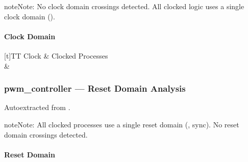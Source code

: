 \documentclass[letterpaper,10pt,english]{sphinxmanual}
\begin{document}
\begin{sphinxadmonition}{note}{Note:}
\sphinxAtStartPar
No clock domain crossings detected. All clocked logic uses a single clock domain ().
\end{sphinxadmonition}


\paragraph{Clock Domain}
\label{\detokenize{modules/pwm_controller/cdc:clock-domain}}

\begin{savenotes}\sphinxattablestart
\sphinxthistablewithglobalstyle
\centering
\begin{tabulary}{\linewidth}[t]{TT}
\sphinxtoprule
\sphinxstyletheadfamily 
\sphinxAtStartPar
Clock
&\sphinxstyletheadfamily 
\sphinxAtStartPar
Clocked Processes
\\
\sphinxmidrule
\sphinxtableatstartofbodyhook
\sphinxAtStartPar
{}
&
\sphinxAtStartPar
{}
\\
\sphinxbottomrule
\end{tabulary}
\sphinxtableafterendhook\par
\sphinxattableend\end{savenotes}

\sphinxstepscope


\subsubsection{pwm\_controller — Reset Domain Analysis}
\label{\detokenize{modules/pwm_controller/reset:pwm-controller-reset-domain-analysis}}\label{\detokenize{modules/pwm_controller/reset::doc}}
\sphinxAtStartPar
Auto\sphinxhyphen{}extracted from .

\begin{sphinxadmonition}{note}{Note:}
\sphinxAtStartPar
All clocked processes use a single reset domain (, sync). No reset domain crossings detected.
\end{sphinxadmonition}


\paragraph{Reset Domain}
\label{\detokenize{modules/pwm_controller/reset:reset-domain}}
\end{document}
